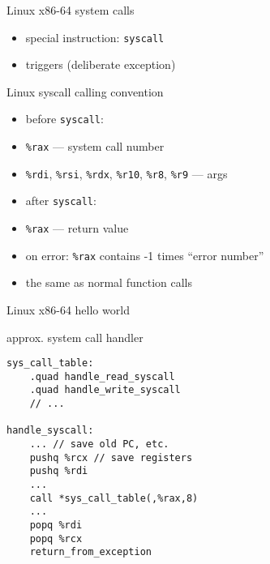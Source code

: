 \begin{frame}{Linux x86-64 system calls}
\begin{itemize}
\item special instruction: {\tt syscall}
\item triggers  (deliberate exception)
\end{itemize}
\end{frame}

\begin{frame}[fragile,label=LinuxSyscall]{Linux syscall calling convention}
\begin{itemize}
\item before {\tt syscall}:
\item \lstinline|%rax| --- system call number
\item \lstinline|%rdi|, \lstinline|%rsi|, \lstinline|%rdx|, \lstinline|%r10|, \lstinline|%r8|, \lstinline|%r9| --- args
\vspace{.5cm}
\item after {\tt syscall}:
\item \lstinline|%rax| --- return value
\item on error: \lstinline|%rax| contains -1 times ``error number''
\vspace{.5cm}
\item {} the same as normal function calls
\end{itemize}
\end{frame}

\begin{frame}{Linux x86-64 hello world}

\end{frame}

\begin{frame}[fragile,label=sysHandler]{approx. system call handler}
\begin{lstlisting}
sys_call_table:
    .quad handle_read_syscall
    .quad handle_write_syscall
    // ...

handle_syscall:
    ... // save old PC, etc.
    pushq %rcx // save registers
    pushq %rdi
    ...
    call *sys_call_table(,%rax,8)
    ...
    popq %rdi
    popq %rcx
    return_from_exception
\end{lstlisting}
\end{frame}


